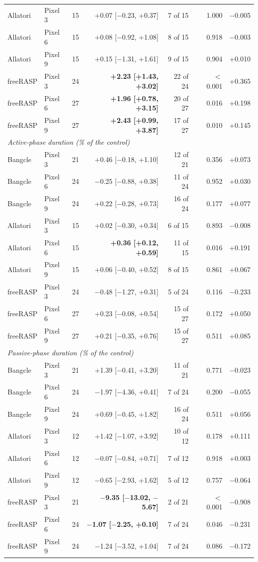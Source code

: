 \begin{table}[t]
\begin{tabular}{llrrrrr}
Allatori & Pixel 3 & 15 & +0.07 [$-$0.23, +0.37] & 7 of 15 & 1.000 & $-$0.005 \\
Allatori & Pixel 6 & 15 & +0.08 [$-$0.92, +1.08] & 8 of 15 & 0.918 & $-$0.003 \\
Allatori & Pixel 9 & 15 & +0.15 [$-$1.31, +1.61] & 9 of 15 & 0.904 & +0.010 \\
freeRASP & Pixel 3 & 24 & \textbf{+2.23 [+1.43, +3.02]} & 22 of 24 & $<$ 0.001 & +0.365 \\
freeRASP & Pixel 6 & 27 & \textbf{+1.96 [+0.78, +3.15]} & 20 of 27 & 0.016 & +0.198 \\
freeRASP & Pixel 9 & 27 & \textbf{+2.43 [+0.99, +3.87]} & 17 of 27 & 0.010 & +0.145 \\
\midrule
\multicolumn{7}{l}{\textit{Active-phase duration (\% of the control)}} \\
Bangcle & Pixel 3 & 21 & +0.46 [$-$0.18, +1.10] & 12 of 21 & 0.356 & +0.073 \\
Bangcle & Pixel 6 & 24 & $-$0.25 [$-$0.88, +0.38] & 11 of 24 & 0.952 & +0.030 \\
Bangcle & Pixel 9 & 24 & +0.22 [$-$0.28, +0.73] & 16 of 24 & 0.177 & +0.077 \\
Allatori & Pixel 3 & 15 & +0.02 [$-$0.30, +0.34] & 6 of 15 & 0.893 & $-$0.008 \\
Allatori & Pixel 6 & 15 & \textbf{+0.36 [+0.12, +0.59]} & 11 of 15 & 0.016 & +0.191 \\
Allatori & Pixel 9 & 15 & +0.06 [$-$0.40, +0.52] & 8 of 15 & 0.861 & +0.067 \\
freeRASP & Pixel 3 & 24 & $-$0.48 [$-$1.27, +0.31] & 5 of 24 & 0.116 & $-$0.233 \\
freeRASP & Pixel 6 & 27 & +0.23 [$-$0.08, +0.54] & 15 of 27 & 0.172 & +0.050 \\
freeRASP & Pixel 9 & 27 & +0.21 [$-$0.35, +0.76] & 15 of 27 & 0.511 & +0.085 \\
\midrule
\multicolumn{7}{l}{\textit{Passive-phase duration (\% of the control)}} \\
Bangcle & Pixel 3 & 21 & +1.39 [$-$0.41, +3.20] & 11 of 21 & 0.771 & $-$0.023 \\
Bangcle & Pixel 6 & 24 & $-$1.97 [$-$4.36, +0.41] & 7 of 24 & 0.200 & $-$0.055 \\
Bangcle & Pixel 9 & 24 & +0.69 [$-$0.45, +1.82] & 16 of 24 & 0.511 & +0.056 \\
Allatori & Pixel 3 & 12 & +1.42 [$-$1.07, +3.92] & 10 of 12 & 0.178 & +0.111 \\
Allatori & Pixel 6 & 12 & $-$0.07 [$-$0.84, +0.71] & 7 of 12 & 0.918 & +0.003 \\
Allatori & Pixel 9 & 12 & $-$0.65 [$-$2.93, +1.62] & 5 of 12 & 0.757 & $-$0.064 \\
freeRASP & Pixel 3 & 21 & \textbf{$-$9.35 [$-$13.02, $-$5.67]} & 2 of 21 & $<$ 0.001 & $-$0.908 \\
freeRASP & Pixel 6 & 24 & \textbf{$-$1.07 [$-$2.25, +0.10]} & 7 of 24 & 0.046 & $-$0.231 \\
freeRASP & Pixel 9 & 24 & $-$1.24 [$-$3.52, +1.04] & 7 of 24 & 0.086 & $-$0.172 \\
\bottomrule
\end{tabular}
\end{table}
